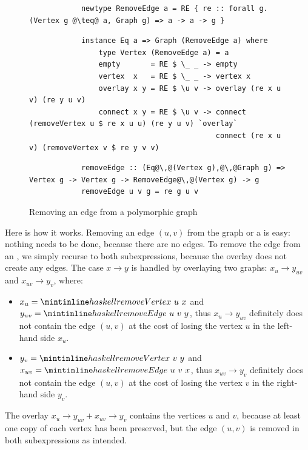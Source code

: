 \begin{figure}
\begin{verbatim}
            newtype RemoveEdge a = RE { re :: forall g. (Vertex g @\teq@ a, Graph g) => a -> a -> g }
\end{verbatim}
\vspace{1mm}
\begin{verbatim}
            instance Eq a => Graph (RemoveEdge a) where
                type Vertex (RemoveEdge a) = a
                empty       = RE $ \_ _ -> empty
                vertex  x   = RE $ \_ _ -> vertex x
                overlay x y = RE $ \u v -> overlay (re x u v) (re y u v)
                connect x y = RE $ \u v -> connect (removeVertex u $ re x u u) (re y u v) `overlay`
                                           connect (re x u v) (removeVertex v $ re y v v)
\end{verbatim}
\vspace{0mm}
\begin{verbatim}
            removeEdge :: (Eq@\,@(Vertex g),@\,@Graph g) => Vertex g -> Vertex g -> RemoveEdge@\,@(Vertex g) -> g
            removeEdge u v g = re g u v
\end{verbatim}
\caption{Removing an edge from a polymorphic graph}
\end{figure}

\noindent
Here is how it works. Removing an edge $(u,v)$ from the  graph
or a  is easy:
nothing needs to be done, because there are no edges. To remove the edge from an
, we simply recurse to both subexpressions, because the overlay does not create
any edges. The  case $x \rightarrow y$ is handled by overlaying two graphs:
$x_u \rightarrow y_{uv}$ and $x_{uv} \rightarrow y_v$, where:

\begin{itemize}
    \item $x_u = \hs{removeVertex}~u~x$ and $y_{uv} = \hs{removeEdge}~u~v~y$,
    thus $x_u \rightarrow y_{uv}$ definitely does not contain the edge $(u,v)$
    at the cost of losing the vertex $u$ in the left-hand side $x_u$.
    \item $y_v = \hs{removeVertex}~v~y$ and $x_{uv} = \hs{removeEdge}~u~v~x$,
    thus $x_{uv} \rightarrow y_v$ definitely does not contain the edge $(u,v)$
    at the cost of losing the vertex $v$ in the right-hand side $y_v$.
\end{itemize}
\noindent
The overlay $x_u \rightarrow y_{uv} + x_{uv} \rightarrow y_v$ contains the
vertices $u$ and $v$, because at least one copy of each vertex has been preserved,
but the edge $(u,v)$ is removed in both subexpressions as intended.

